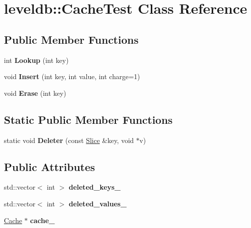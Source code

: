\hypertarget{classleveldb_1_1_cache_test}{}\section{leveldb\+:\+:Cache\+Test Class Reference}
\label{classleveldb_1_1_cache_test}
\subsection*{Public Member Functions}
\begin{DoxyCompactItemize}
\item 
\mbox{\label{classleveldb_1_1_cache_test_a90d19cd6098f10f809f0c3b94e8b3fc6}} 
int {\bfseries Lookup} (int key)
\item 
\mbox{\label{classleveldb_1_1_cache_test_ad7fc76253a92137e62aede17322c7286}} 
void {\bfseries Insert} (int key, int value, int charge=1)
\item 
\mbox{\label{classleveldb_1_1_cache_test_aeaa81bbd9d0fba1fb31b0a8f7aa94397}} 
void {\bfseries Erase} (int key)
\end{DoxyCompactItemize}
\subsection*{Static Public Member Functions}
\begin{DoxyCompactItemize}
\item 
\mbox{\label{classleveldb_1_1_cache_test_aa8d3ce31a1995da33810f2b5320089ab}} 
static void {\bfseries Deleter} (const \mbox{\hyperlink{classleveldb_1_1_slice}{Slice}} \&key, void $\ast$v)
\end{DoxyCompactItemize}
\subsection*{Public Attributes}
\begin{DoxyCompactItemize}
\item 
\mbox{\label{classleveldb_1_1_cache_test_aad6b825748f29b973a8934682eb50ed2}} 
std\+::vector$<$ int $>$ {\bfseries deleted\+\_\+keys\+\_\+}
\item 
\mbox{\label{classleveldb_1_1_cache_test_add979edecc72f9740b1d6d4951c13c02}} 
std\+::vector$<$ int $>$ {\bfseries deleted\+\_\+values\+\_\+}
\item 
\mbox{\label{classleveldb_1_1_cache_test_af2edcc8a47148050ba791f6a2b7a6165}} 
\mbox{\hyperlink{classleveldb_1_1_cache}{Cache}} $\ast$ {\bfseries cache\+\_\+}
\end{DoxyCompactItemize}

